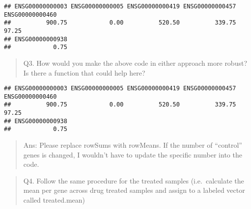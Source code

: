 \documentclass[
]{article}
\newenvironment{Shaded}{\begin{snugshade}}{\end{snugshade}}
\newcommand{\FunctionTok}[1]{\textcolor[rgb]{0.13,0.29,0.53}{\textbf{#1}}}
\newcommand{\NormalTok}[1]{#1}
\newcommand{\OtherTok}[1]{\textcolor[rgb]{0.56,0.35,0.01}{#1}}
\newcommand{\SpecialCharTok}[1]{\textcolor[rgb]{0.81,0.36,0.00}{\textbf{#1}}}
\newcommand{\StringTok}[1]{\textcolor[rgb]{0.31,0.60,0.02}{#1}}
\begin{document}
\begin{verbatim}
## ENSG00000000003 ENSG00000000005 ENSG00000000419 ENSG00000000457 ENSG00000000460 
##          900.75            0.00          520.50          339.75           97.25 
## ENSG00000000938 
##            0.75
\end{verbatim}

\begin{quote}
Q3. How would you make the above code in either approach more robust? Is
there a function that could help here?
\end{quote}

\begin{Shaded}
\end{Shaded}

\begin{verbatim}
## ENSG00000000003 ENSG00000000005 ENSG00000000419 ENSG00000000457 ENSG00000000460 
##          900.75            0.00          520.50          339.75           97.25 
## ENSG00000000938 
##            0.75
\end{verbatim}

\begin{quote}
Ans: Please replace rowSums with rowMeans. If the number of ``control''
genes is changed, I wouldn't have to update the specific number into the
code.
\end{quote}

\begin{quote}
Q4. Follow the same procedure for the treated samples (i.e.~calculate
the mean per gene across drug treated samples and assign to a labeled
vector called treated.mean)
\end{quote}

\begin{Shaded}
\end{Shaded}
\end{document}
